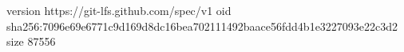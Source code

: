 version https://git-lfs.github.com/spec/v1
oid sha256:7096e69e6771c9d169d8dc16bea702111492baace56fdd4b1e3227093e22c3d2
size 87556
